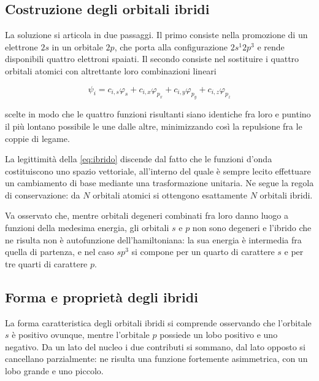 \subsection{Costruzione degli orbitali ibridi}

La soluzione si articola in due passaggi. Il primo consiste nella promozione di un elettrone $2s$ in un orbitale $2p$, che porta alla configurazione $2s^1 2p^3$ e rende disponibili quattro elettroni spaiati. 
Il secondo consiste nel sostituire i quattro orbitali atomici con altrettante loro combinazioni lineari

\begin{equation}
    \psi_i = c_{i,s} \varphi_s + c_{i,x} \varphi_{p_x} + c_{i,y} \varphi_{p_y} + c_{i,z} \varphi_{p_z}
    \label{eq:ibrido}
\end{equation}

scelte in modo che le quattro funzioni risultanti siano identiche fra loro e puntino il più lontano possibile le une dalle altre, minimizzando così la repulsione fra le coppie di legame.

La legittimità della \eqref{eq:ibrido} discende dal fatto che le funzioni d'onda costituiscono uno spazio vettoriale, all'interno del quale è sempre lecito effettuare un cambiamento di base mediante una trasformazione unitaria.
Ne segue la regola di conservazione: da $N$ orbitali atomici si ottengono esattamente $N$ orbitali ibridi.

Va osservato che, mentre orbitali degeneri combinati fra loro danno luogo a funzioni della medesima energia, gli orbitali $s$ e $p$ non sono degeneri e l'ibrido che ne risulta non è autofunzione dell'hamiltoniana: la sua energia è intermedia fra quella di partenza, e nel caso $sp^3$ si compone per un quarto di carattere $s$ e per tre quarti di carattere $p$.

\subsection{Forma e proprietà degli ibridi}

La forma caratteristica degli orbitali ibridi si comprende osservando che l'orbitale $s$ è positivo ovunque, mentre l'orbitale $p$ possiede un lobo positivo e uno negativo. 
Da un lato del nucleo i due contributi si sommano, dal lato opposto si cancellano parzialmente: ne risulta una funzione fortemente asimmetrica, con un lobo grande e uno piccolo. 

